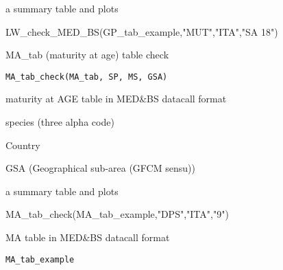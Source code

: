 \documentclass[a4paper]{book}
\begin{document}
%
\begin{Value}
a summary table and plots
\end{Value}
%
\begin{Examples}
\begin{ExampleCode}
LW_check_MED_BS(GP_tab_example,"MUT","ITA","SA 18")
\end{ExampleCode}
\end{Examples}
%
\begin{Description}\relax
MA\_tab (maturity at age) table check
\end{Description}
%
\begin{Usage}
\begin{verbatim}
MA_tab_check(MA_tab, SP, MS, GSA)
\end{verbatim}
\end{Usage}
%
\begin{Arguments}
\begin{ldescription}
\item[\code{MA\_tab}] maturity at AGE table in MED\&BS datacall format

\item[\code{SP}] species (three alpha code)

\item[\code{MS}] Country

\item[\code{GSA}] GSA (Geographical sub-area (GFCM sensu))
\end{ldescription}
\end{Arguments}
%
\begin{Value}
a summary table and plots
\end{Value}
%
\begin{Examples}
\begin{ExampleCode}
MA_tab_check(MA_tab_example,"DPS","ITA","9")
\end{ExampleCode}
\end{Examples}
%
\begin{Description}\relax
MA table in MED\&BS datacall format
\end{Description}
%
\begin{Usage}
\begin{verbatim}
MA_tab_example
\end{verbatim}
\end{Usage}
\end{document}
